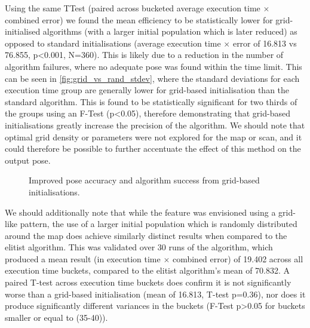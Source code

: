 \documentclass[authoryearcitations]{UoYCSproject}
\begin{document}
Using the same TTest (paired across bucketed average execution time $\times$ combined error) we found the mean efficiency to be statistically lower for grid-initialised algorithms (with a larger initial population which is later reduced) as opposed to standard initialisations (average execution time $\times$ error of 16.813 vs 76.855, p<0.001, N=360). This is likely due to a reduction in the number of algorithm failures, where no adequate pose was found within the time limit. This can be seen in \autoref{fig:grid_vs_rand_stdev}, where the standard deviations for each execution time group are generally lower for grid-based initialisation than the standard algorithm. This is found to be statistically significant for two thirds of the groups using an F-Test (p<0.05), therefore demonstrating that grid-based initialisations greatly increase the precision of the algorithm. We should note that optimal grid density or parameters were not explored for the map or scan, and it could therefore be possible to further accentuate the effect of this method on the output pose.

\datatablegridstdev

\begin{figure}
	\centering
	\caption[Grid vs. random population layout]{Improved pose accuracy and algorithm success from grid-based initialisations.}
	\label{fig:grid_vs_rand_stdev}
\end{figure}

We should additionally note that while the feature was envisioned using a grid-like pattern, the use of a larger initial population which is randomly distributed around the map does achieve similarly distinct results when compared to the elitist algorithm. This was validated over 30 runs of the algorithm, which produced a mean result (in execution time $\times$ combined error) of 19.402 across all execution time buckets, compared to the elitist algorithm's mean of 70.832. A paired T-test across execution time buckets does confirm it is not significantly worse than a grid-based initialisation (mean of 16.813, T-test p=0.36), nor does it produce significantly different variances in the buckets (F-Test p>0.05 for buckets smaller or equal to (35-40)). 
\end{document}
